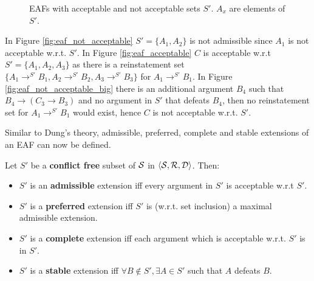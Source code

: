 \begin{figure}[h]
{
		\label{fig:eaf_not_acceptable_big}
	}
	\caption{\glspl{EAF} with acceptable and not acceptable sets $S'$. $A_x$ are elements of $S'$.}
\end{figure}

\begin{exa}
	In Figure \autoref{fig:eaf_not_acceptable} $S'=\{A_1, A_2\}$ is not admissible since $A_1$ is not acceptable w.r.t. $S'$. In Figure \autoref{fig:eaf_acceptable} $C$ is acceptable w.r.t $S' = \{A_1, A_2, A_3\}$ as there is a reinstatement set $\{A_1 \rightarrow^{S'} B_1, A_2 \rightarrow^{S'} B_2, A_3 \rightarrow^{S'} B_3\}$ for $A_1 \rightarrow^{S'} B_1$. In Figure \autoref{fig:eaf_not_acceptable_big} there is an additional argument $B_4$ such that $B_4 \rightarrow (C_3 \rightarrow B_3)$ and no argument in $S'$ that defeats $B_4$, then no reinstatement set for $A_1 \rightarrow^{S'} B_1$ would exist, hence $C$ is not acceptable w.r.t. $S'$.
\end{exa}

Similar to Dung's theory, admissible, preferred, complete and stable extensions of an \gls{EAF} can now be defined.


\begin{definition}
	Let $S'$ be a \textbf{conflict free} subset of $\S$ in $\langle \S, \R, \D \rangle$. Then:
	\begin{itemize}
		\item $S'$ is an \textbf{admissible} extension iff every argument in $S'$ is acceptable w.r.t $S'$.
		\item $S'$ is a \textbf{preferred} extension iff $S'$ is (w.r.t. set inclusion) a maximal admissible extension.
		\item $S'$ is a \textbf{complete} extension iff each argument which is acceptable w.r.t. $S'$ is in $S'$.
		\item $S'$ is a \textbf{stable} extension iff $\forall B \notin S', \exists A \in S'$ such that $A$ defeats $B$.
	\end{itemize}
\end{definition}


